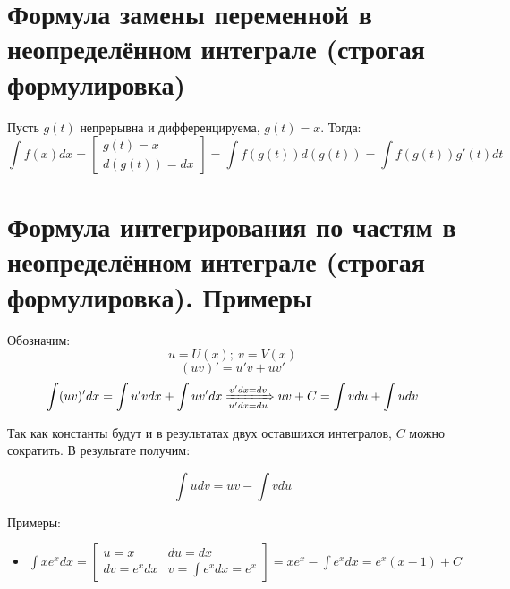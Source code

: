 \documentclass[12pt]{article}
\begin{document}
\section{Формула замены переменной в неопределённом интеграле (строгая формулировка)}
Пусть $g(t)$ непрерывна и дифференцируема, $g(t) = x$. Тогда:
\[
    \int f(x) dx = \left[\begin{array}{c}
            g(t) = x \\
            d(g(t)) = dx
        \end{array}\right] = \int f(g(t)) d(g(t)) = \int f(g(t))g'(t)dt
\]

\section{Формула интегрирования по частям в неопределённом интеграле (строгая
  формулировка). Примеры}
Обозначим:
\[
    u = U(x); \ v = V(x)
\]
\[
    (uv)' = u'v + uv'
\]
\[
    \int (uv)'dx = \int u'vdx + \int uv'dx \xRightarrow[u'dx = du]{v'dx = dv} uv + C = \int v du + \int u dv
\]

Так как константы будут и в результатах двух оставшихся интегралов, $C$ можно сократить. В результате получим:

\[
    \int udv = uv - \int vdu
\]

Примеры:
\begin{itemize}
    \item $\displaystyle \int xe^{x}dx = \left[\begin{array}{ll}
                      u = x        & du = dx              \\
                      dv = e^{x}dx & v = \int e^xdx = e^x
                  \end{array}\right] = xe^x - \int e^xdx = e^x(x - 1) + C$
\end{itemize}
\end{document}
